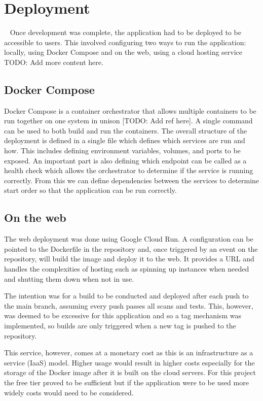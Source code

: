 \chapter{Deployment}~\label{cha:deployment}
Once development was complete, the application had to be deployed to be accessible to users. This involved configuring two ways to run the application: locally, using Docker Compose and on the web, using a cloud hosting service
TODO: Add more content here.

\section{Docker Compose}
Docker Compose is a container orchestrator that allows multiple containers to be run together on one system in unison [TODO: Add ref here]. A single command can be used to both build and run the containers. The overall structure of the deployment is defined in a single file which defines which services are run and how. This includes defining environment variables, volumes, and ports to be exposed. An important part is also defining which endpoint can be called as a health check which allows the orchestrator to determine if the service is running correctly. From this we can define dependencies between the services to determine start order so that the application can be run correctly.

\section{On the web}
The web deployment was done using Google Cloud Run. A configuration can be pointed to the Dockerfile in the repository and, once triggered by an event on the repository, will build the image and deploy it to the web. It provides a URL and handles the complexities of hosting such as spinning up instances when needed and shutting them down when not in use.

The intention was for a build to be conducted and deployed after each push to the main branch, assuming every push passes all scans and tests. This, however, was deemed to be excessive for this application and so a tag mechanism was implemented, so builds are only triggered when a new tag is pushed to the repository.

This service, however, comes at a monetary cost as this is an infrastructure as a service (IaaS) model. Higher usage would result in higher costs especially for the storage of the Docker image after it is built on the cloud servers. For this project the free tier proved to be sufficient but if the application were to be used more widely costs would need to be considered.
